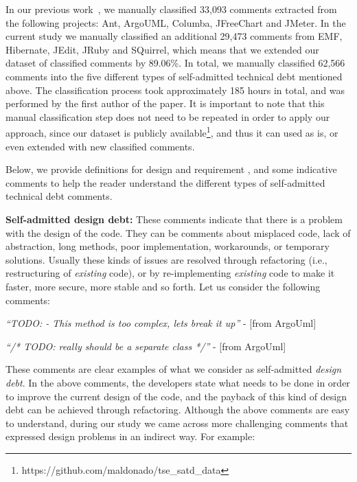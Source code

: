 In our previous work~\cite{Maldonado2015MTD}, we manually classified 33,093 comments extracted from the following projects: Ant, ArgoUML, Columba, JFreeChart and JMeter. In the current study we manually classified an additional 29,473 comments from EMF, Hibernate, JEdit, JRuby and SQuirrel, which means that we extended our dataset of classified comments by 89.06\%. In total, we manually classified 62,566 comments into the five different types of self-admitted technical debt mentioned above. The classification process took approximately 185 hours in total, and was performed by the first author of the paper. It is important to note that this manual classification step does not need to be repeated in order to apply our approach, since our dataset is publicly available\footnote{https://github.com/maldonado/tse\_satd\_data}, and thus it can used as is, or even extended with new classified comments. 

Below, we provide definitions for design and requirement \SATD, and some indicative comments to help the reader understand the different types of self-admitted technical debt comments.

\vspace{1mm}
\noindent\textbf{Self-admitted design debt:} These comments indicate that there is a problem with the design of the code. They can be comments about misplaced code, lack of abstraction, long methods, poor implementation, workarounds, or temporary solutions. Usually these kinds of issues are resolved through refactoring (i.e., restructuring of \emph{existing} code), or by re-implementing \emph{existing} code to make it faster, more secure, more stable and so forth. Let us consider the following comments:

\vspace{1mm}
    \begin{displayquote}
        \textit{``TODO: - This method is too complex, lets break it up''} - [from ArgoUml]
    \end{displayquote}
    \vspace{1mm}
    \begin{displayquote}
     \textit{``/* TODO: really should be a separate class */''} - [from ArgoUml]
    \end{displayquote}
\vspace{1mm}

These comments are clear examples of what we consider as self-admitted \emph{design debt}. In the above comments, the developers state what needs to be done in order to improve the current design of the code, and
the payback of this kind of design debt can be achieved through refactoring.
Although the above comments are easy to understand, during our study we came across more challenging comments that expressed design problems in an indirect way. For example: 

